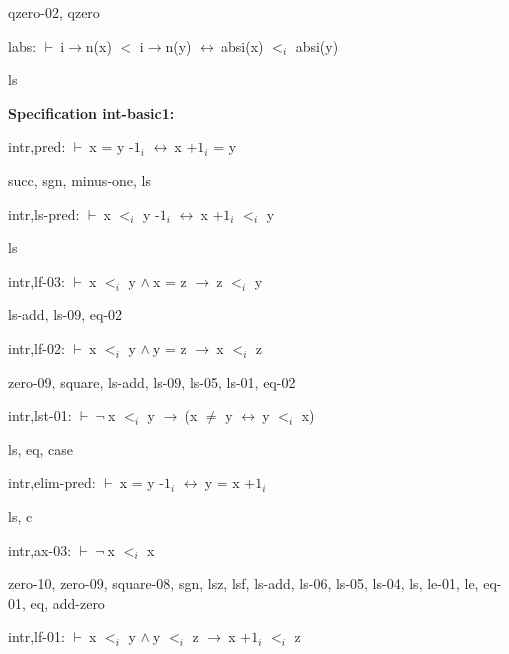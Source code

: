 \documentclass[a4paper]{article}
\newcommand{\Fol}{\mbox{$\vdash\ $}}
\newcommand{\Not}{\mbox{$\neg\ $}}
\newcommand{\And}{\mbox{$\wedge\ $}}
\newcommand{\Imp}{\mbox{$\rightarrow\ $}}
\newcommand{\Equiv}{\mbox{$\leftrightarrow\ $}}
\begin{document}
qzero-02, qzero

\bigskip

labs: 
 \Fol i$\to$n(x) $<$ i$\to$n(y) \Equiv absi(x) $\mbox{$<$}_{i}$ absi(y)



ls

\bigskip

{\bf Specification int-basic1:}

intr,pred: 
 \Fol x = y $\mbox{-1}_{i}$ \Equiv x $\mbox{+1}_{i}$ = y



succ, sgn, minus-one, ls

\bigskip

intr,ls-pred: 
 \Fol x $\mbox{$<$}_{i}$ y $\mbox{-1}_{i}$ \Equiv x $\mbox{+1}_{i}$ $\mbox{$<$}_{i}$ y



ls

\bigskip

intr,lf-03: 
 \Fol x $\mbox{$<$}_{i}$ y \And x = z \Imp z $\mbox{$<$}_{i}$ y



ls-add, ls-09, eq-02

\bigskip

intr,lf-02: 
 \Fol x $\mbox{$<$}_{i}$ y \And y = z \Imp x $\mbox{$<$}_{i}$ z



zero-09, square, ls-add, ls-09, ls-05, ls-01, eq-02

\bigskip

intr,lst-01: 
 \Fol \Not x $\mbox{$<$}_{i}$ y \Imp (x $\neq$ y \Equiv y $\mbox{$<$}_{i}$ x)



ls, eq, case

\bigskip

intr,elim-pred: 
 \Fol x = y $\mbox{-1}_{i}$ \Equiv y = x $\mbox{+1}_{i}$



ls, c

\bigskip

intr,ax-03: 
 \Fol \Not x $\mbox{$<$}_{i}$ x



zero-10, zero-09, square-08, sgn, lsz, lsf, ls-add, ls-06, ls-05, ls-04, ls, le-01, le, eq-01, eq, add-zero

\bigskip

intr,lf-01: 
 \Fol x $\mbox{$<$}_{i}$ y \And y $\mbox{$<$}_{i}$ z \Imp x $\mbox{+1}_{i}$ $\mbox{$<$}_{i}$ z
\end{document}
